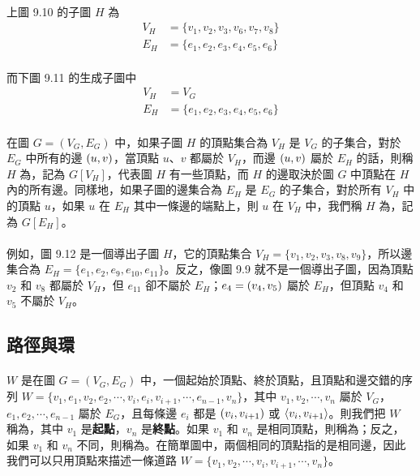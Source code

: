 \documentclass[12pt,a4paper,oneside]{report}
\begin{document}
\begin{CJK}{UTF8}{bkai}
\paragraph{}上圖 9.10 的子圖 $H$ 為
\begin{align*}
V_H&=\{v_1,v_2,v_3,v_6,v_7,v_8\}\\
E_H&=\{e_1,e_2,e_3,e_4,e_5,e_6\}
\end{align*}
\paragraph{}而下圖 9.11 的生成子圖中
\begin{align*}
V_H&=V_G\\
E_H&=\{e_1,e_2,e_3,e_4,e_5,e_6\}
\end{align*}
\paragraph{}在圖 $G=(V_G, E_G)$ 中，如果子圖 $H$ 的頂點集合為 $V_H$ 是 $V_G$ 的子集合，對於 $E_G$ 中所有的邊 $({u},{v})$，當頂點 $u$、$v$ 都屬於 $V_H$，而邊 $({u},{v})$ 屬於 $E_H$ 的話，則稱 $H$ 為\textbf{}，記為 $G[V_H]$，代表圖 $H$ 有一些頂點，而 $H$ 的邊取決於圖 $G$ 中頂點在 $H$ 內的所有邊。同樣地，如果子圖的邊集合為 $E_H$ 是 $E_G$ 的子集合，對於所有 $V_H$ 中的頂點 $u$，如果 $u$ 在 $E_H$ 其中一條邊的端點上，則 $u$ 在 $V_H$ 中，我們稱 $H$ 為，記為 $G[E_H]$。
\paragraph{}例如，圖 9.12 是一個導出子圖 $H$，它的頂點集合 $V_H=\{v_1,v_2,v_3,v_8,v_9\}$，所以邊集合為 $E_H=\{e_1,e_2,e_9,e_{10},e_{11}\}$。反之，像圖 9.9 就不是一個導出子圖，因為頂點 $v_2$ 和 $v_8$ 都屬於 $V_H$，但 $e_{11}$ 卻不屬於 $E_H$；$e_4=({v_4},{v_5})$ 屬於 $E_H$，但頂點 $v_4$ 和 $v_5$ 不屬於 $V_H$。

\subsection{路徑與環}
\paragraph{}$W$ 是在圖 $G=(V_G,E_G)$ 中，一個起始於頂點、終於頂點，且頂點和邊交錯的序列 $W=\{{v_1,e_1,v_2,e_2,\cdots{}, v_i,e_i,v_{i+1},\cdots{},e_{n-1},v_n}\}$，其中 $v_1,v_2,\cdots{},v_n$ 屬於 $V_G$，$e_1,e_2,\cdots{},e_{n-1}$ 屬於 $E_G$，且每條邊 $e_i$ 都是 $({v_i},{v_{i+1}})$ 或 $\langle{}{{v_i},{v_{i+1}}}\rangle{}$。則我們把 $W$ 稱為\textbf{}，其中 $v_1$ 是\textbf{起點}，$v_n$ 是\textbf{終點}。如果 $v_1$ 和 $v_n$ 是相同頂點，則稱為；反之，如果 $v_1$ 和 $v_n$ 不同，則稱為。在簡單圖中，兩個相同的頂點指的是相同邊，因此我們可以只用頂點來描述一條道路 $W=\{{v_1,v_2,\cdots{},v_i,v_{i+1},\cdots{},v_n}\}$。

\end{CJK}
\end{document}
